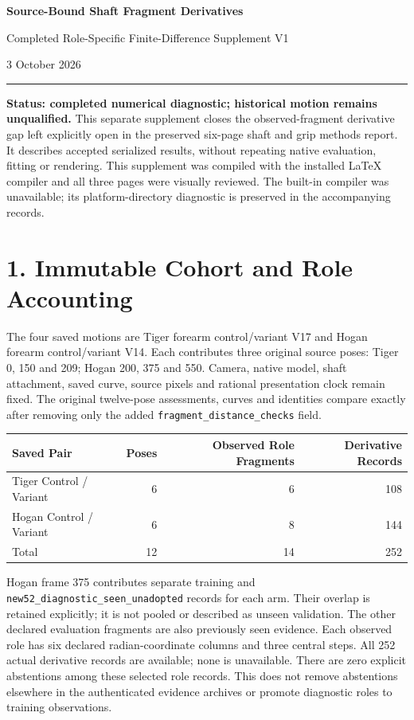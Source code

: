\documentclass[11pt,a4paper]{article}
\newcommand{\code}[1]{{\small\nolinkurl{#1}}}
\begin{document}
{\LARGE\bfseries\color{ink} Source-Bound Shaft Fragment Derivatives}\par
{\large Completed Role-Specific Finite-Difference Supplement V1}\par
3 October 2026\par\rule{\linewidth}{0.7pt}
\textbf{Status: completed numerical diagnostic; historical motion remains unqualified.}
This separate supplement closes the observed-fragment derivative gap left explicitly
open in the preserved six-page shaft and grip methods report. It describes accepted
serialized results, without repeating native evaluation, fitting or rendering.
This supplement was compiled with the installed LaTeX compiler and all three
pages were visually reviewed. The built-in compiler was unavailable; its
platform-directory diagnostic is preserved in the accompanying records.

\section*{1. Immutable Cohort and Role Accounting}
The four saved motions are Tiger forearm control/variant V17 and Hogan forearm
control/variant V14. Each contributes three original source poses: Tiger
0, 150 and 209; Hogan 200, 375 and 550. Camera, native model, shaft attachment,
saved curve, source pixels and rational presentation clock remain fixed.
The original twelve-pose assessments, curves and identities compare exactly after
removing only the added \code{fragment_distance_checks} field.

\begin{center}\small
\begin{tabular}{@{}lrrr@{}}\toprule
Saved Pair & Poses & Observed Role Fragments & Derivative Records\\\midrule
Tiger Control / Variant & 6 & 6 & 108\\
Hogan Control / Variant & 6 & 8 & 144\\\midrule
Total & 12 & 14 & 252\\\bottomrule
\end{tabular}\end{center}
Hogan frame 375 contributes separate training and
\code{new52_diagnostic_seen_unadopted} records for each arm. Their overlap is
retained explicitly; it is not pooled or described as unseen validation.
The other declared evaluation fragments are also previously seen evidence.
Each observed role has six declared radian-coordinate columns and three central
steps. All 252 actual derivative records are available; none is unavailable.
There are zero explicit abstentions among these selected role records. This does
not remove abstentions elsewhere in the authenticated evidence archives or promote
diagnostic roles to training observations.
\end{document}
